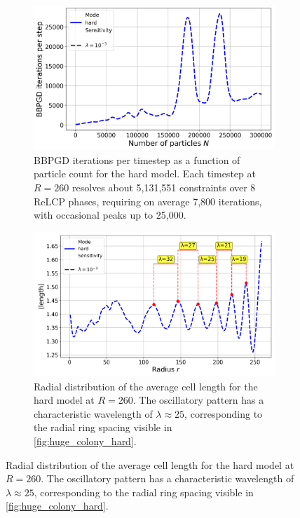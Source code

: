 \documentclass[conference]{IEEEtran}
\begin{document}
\begin{figure}[H]
    \centering

    \begin{subfigure}[b]{\linewidth}
        \centering
        \includegraphics[width=\linewidth]{figures/huge/huge_bbpgd_iterations_per_step_vs_num_particles.png}
        \caption{BBPGD iterations per timestep as a function of particle count for the hard model. Each timestep at $R = 260$ resolves about 5{,}131{,}551 constraints over 8 ReLCP phases, requiring on average 7{,}800 iterations, with occasional peaks up to 25{,}000.}
        \label{fig:huge_bbpgd_iterations_per_step_vs_num_particles}
    \end{subfigure}

    \begin{subfigure}[b]{\linewidth}
        \centering
        \includegraphics[width=\linewidth]{figures/huge/huge_mode_length_wavelengths.png}
        \caption{Radial distribution of the average cell length for the hard model at $R = 260$. The oscillatory pattern has a characteristic wavelength of $\lambda \approx 25$, corresponding to the radial ring spacing visible in \autoref{fig:huge_colony_hard}.}
        \label{fig:huge_mode_length_wavelengths}
    \end{subfigure}


\end{figure}
\end{document}
